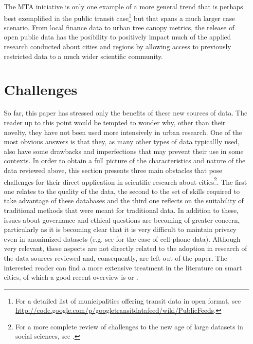 \documentclass[12pt]{article}
\begin{document}
The MTA iniciative is only one example of a more general trend that is
perhaps best exemplified in the public transit case\footnote{For a detailed list of
municipalities offering transit data in open format, see
\url{http://code.google.com/p/googletransitdatafeed/wiki/PublicFeeds}.} but
that spans a much larger case scenario. From local finance data to urban tree
canopy metrics, the
release of open public data has the posibility to positively impact much of
the applied research conducted about cities and regions by allowing access to
previously restricted data to a much wider scientific community.

\section{Challenges}
\label{challenges}
So far, this paper has stressed only the benefits of these new sources of
data. The reader up to this point would be tempted to wonder why, other than
their novelty, they have not been used more intensively in urban research. 
One of the most obvious answers is that they, as many other types of data
typicallly used, also have some drawbacks and imperfections that may prevent
their use in some contexts.
%
In order to obtain a full picture of the characteristics and nature of the
data reviewed above, this section presents three main obstacles that pose
challenges for their direct application in scientific research about
cities\footnote{For a more complete review of challenges to the new age of
large datasets in social sciences, see \cite{king_science_ensuring}.}.
The first one relates to the quality of the data, the second to the set of
skills required to take advantage of these databases and the third one
reflects on the suitability of traditional methods that were meant for
traditional data. 
In addition to these, issues about governance and
ethical questions are becoming of greater concern, particularly as it is
becoming clear that it is very difficult to maintain privacy even in
anonimized datasets (e.g. see \citealp{unique_crowd} for the case of cell-phone
data). Although very relevant, these
aspects are not directly related to the adoption in research of the data
sources reviewed and, consequently, are left out of
the paper. The interested reader
can find a more extensive treatment in the literature on smart cities, of which
a good recent overview is \cite{battyetal2012smartcities} or \cite{kitchin2013}.
\end{document}
